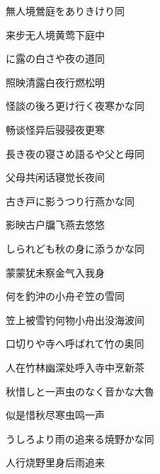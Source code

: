 \begin{haiku}
    {\FH 無人境鶯庭をありきけり}\hfill{\FH 同}

    {\FK 来步无人境黄莺下庭中}
\end{haiku}

\begin{haiku}
    {\FH {}に露の白さや夜の道}\hfill{\FH 同}

    {\FK 照映清露白夜行燃松明}
\end{haiku}

\begin{haiku}
    {\FH 怪談の後ろ更け行く夜寒かな}\hfill{\FH 同}

    {\FK 畅谈怪异后骎骎夜更寒}
\end{haiku}

\begin{haiku}
    {\FH 長き夜の寝さめ語るや父と母}\hfill{\FH 同}

    {\FK 父母共闲话寝觉长夜间}
\end{haiku}

\begin{haiku}
    {\FH 古き戸に影うつり行燕かな}\hfill{\FH 同}

    {\FK 影映古户牖飞燕去悠悠}
\end{haiku}

\begin{haiku}
    {\FH しられども秋の身に添うかな}\hfill{\FH 同}

    {\FK 蒙蒙犹未察金气入我身}
\end{haiku}

\begin{haiku}
    {\FH 何を釣沖の小舟ぞ笠の雪}\hfill{\FH 同}

    {\FK 笠上被雪钓何物小舟出没海波间}
\end{haiku}

\begin{haiku}
    {\FH 口切りや寺へ呼ばれて竹の奥}\hfill{\FH 同}

    {\FK 人在竹林幽深处呼入寺中烹新茶}
\end{haiku}

\begin{haiku}
    {\FH 秋惜しと一声虫のなく音かな}\hfill{\FH 大魯}

    {\FK 似是惜秋尽寒虫鸣一声}
\end{haiku}

\begin{haiku}
    {\FH うしろより雨の追来る焼野かな}\hfill{\FH 同}

    {\FK 人行烧野里身后雨追来}

\end{haiku}

